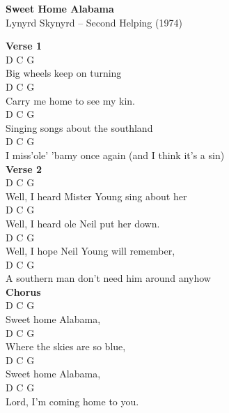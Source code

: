 \documentclass[a4paper]{article}
\begin{document}
    \begin{center}
        \textbf{Sweet Home Alabama}
        ~\\
        Lynyrd Skynyrd -- Second Helping (1974)
    \end{center}
    {
        \scriptsize
        \textbf{Verse 1}
        ~\\
        {
            \cutive
            \obeyspaces
D   C              G
\\
Big wheels keep on turning
\\
D        C              G
\\
Carry me home to see my kin.
\\
D       C               G
\\
Singing songs about the southland
\\
D            C          G 
\\
I miss'ole' 'bamy once again (and I think it's a sin)
\\

        }
        \textbf{Verse 2}
        ~\\
        {
            \cutive
            \obeyspaces
D                    C           G
\\
Well, I heard Mister Young sing about her
\\
D                 C            G
\\
Well, I heard ole Neil put her down.
\\
D                 C            G
\\
Well, I hope Neil Young will remember,
\\
D          C                   G
\\
A southern man don't need him around anyhow
\\

        }
        \textbf{Chorus}
        ~\\
        {
            \cutive
            \obeyspaces
D     C       G
\\
Sweet home Alabama, 
\\
D         C            G
\\
Where the skies are so blue, 
\\
D     C       G         
\\
Sweet home Alabama,   
\\
D         C              G                  
\\
Lord, I'm coming home to you.
\\

}}
\end{document}
